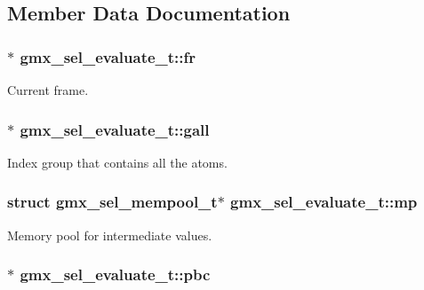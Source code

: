 \subsection{\-Member \-Data \-Documentation}
\hypertarget{structgmx__sel__evaluate__t_a42a5d14474c3e7a66eca0c9663476846}{
\subsubsection[{fr}]{$\ast$ {\bf gmx\-\_\-sel\-\_\-evaluate\-\_\-t\-::fr}}}\label{structgmx__sel__evaluate__t_a42a5d14474c3e7a66eca0c9663476846}
\-Current frame. \hypertarget{structgmx__sel__evaluate__t_ad31bc09d5d4da61e315dfade58657180}{
\subsubsection[{gall}]{$\ast$ {\bf gmx\-\_\-sel\-\_\-evaluate\-\_\-t\-::gall}}}\label{structgmx__sel__evaluate__t_ad31bc09d5d4da61e315dfade58657180}
\-Index group that contains all the atoms. \hypertarget{structgmx__sel__evaluate__t_a69c8a62791c3ae6ddfb0e0a9863c2077}{
\subsubsection[{mp}]{\setlength{\rightskip}{0pt plus 5cm}struct {\bf gmx\-\_\-sel\-\_\-mempool\-\_\-t}$\ast$ {\bf gmx\-\_\-sel\-\_\-evaluate\-\_\-t\-::mp}}}\label{structgmx__sel__evaluate__t_a69c8a62791c3ae6ddfb0e0a9863c2077}
\-Memory pool for intermediate values. \hypertarget{structgmx__sel__evaluate__t_ad45dbdc326186b045973ef3ba68bf677}{
\subsubsection[{pbc}]{$\ast$ {\bf gmx\-\_\-sel\-\_\-evaluate\-\_\-t\-::pbc}}}\label{structgmx__sel__evaluate__t_ad45dbdc326186b045973ef3ba68bf677}
